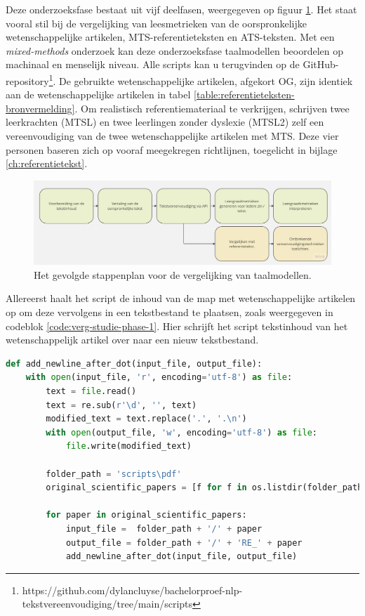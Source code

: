 Deze onderzoeksfase bestaat uit vijf deelfasen, weergegeven op figuur \ref{img:flowchart-vergelijkende-studie-metrics}. Het staat vooral stil bij de vergelijking van leesmetrieken van de oorspronkelijke wetenschappelijke artikelen, MTS-referentieteksten en ATS-teksten. Met een \textit{mixed-methods} onderzoek kan deze onderzoeksfase taalmodellen beoordelen op machinaal en menselijk niveau. Alle scripts kan u terugvinden op de GitHub-repository\footnote{https://github.com/dylancluyse/bachelorproef-nlp-tekstvereenvoudiging/tree/main/scripts}. De gebruikte wetenschappelijke artikelen, afgekort OG, zijn identiek aan de wetenschappelijke artikelen in tabel \ref{table:referentieteksten-bronvermelding}. Om realistisch referentiemateriaal te verkrijgen, schrijven twee leerkrachten (MTSL) en twee leerlingen zonder dyslexie (MTSL2) zelf een vereenvoudiging van de twee wetenschappelijke artikelen met MTS. Deze vier personen baseren zich op vooraf meegekregen richtlijnen, toegelicht in bijlage \ref{ch:referentietekst}. 

\begin{figure}
	\includegraphics[width=\linewidth]{img/flowchart-vergelijkende-studie.jpg}
	\caption{Het gevolgde stappenplan voor de vergelijking van taalmodellen.}
	\label{img:flowchart-vergelijkende-studie-metrics}
\end{figure}

Allereerst haalt het script de inhoud van de map met wetenschappelijke artikelen op om deze vervolgens in een tekstbestand te plaatsen, zoals weergegeven in codeblok \ref{code:verg-studie-phase-1}. Hier schrijft het script tekstinhoud van het wetenschappelijk artikel over naar een nieuw tekstbestand.

\begin{lstlisting}[language=Python, caption={Script voor de eerste fase van de vergelijkende studie.}, label={code:verg-studie-phase-1}]
def add_newline_after_dot(input_file, output_file):
	with open(input_file, 'r', encoding='utf-8') as file:
		text = file.read()
		text = re.sub(r'\d', '', text)
		modified_text = text.replace('.', '.\n')
		with open(output_file, 'w', encoding='utf-8') as file:
			file.write(modified_text)
		
		folder_path = 'scripts\pdf'
		original_scientific_papers = [f for f in os.listdir(folder_path)]
		
		for paper in original_scientific_papers:
			input_file =  folder_path + '/' + paper
			output_file = folder_path + '/' + 'RE_' + paper
			add_newline_after_dot(input_file, output_file)
\end{lstlisting} 

